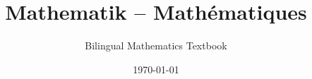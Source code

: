 



\title{Mathematik -- Mathématiques}
\author{Bilingual Mathematics Textbook}
\date{\today}
\maketitle

\tableofcontents




\printindex

